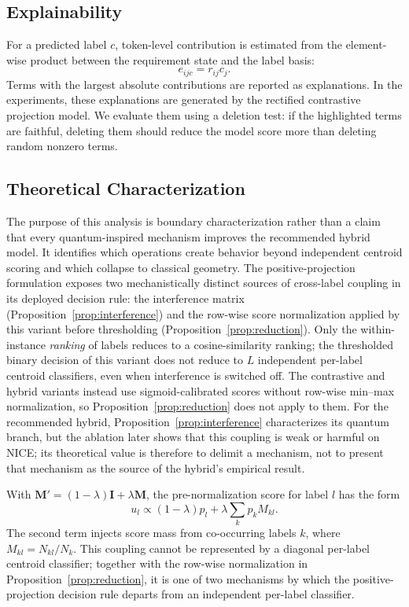 \documentclass[runningheads]{llncs}
\begin{document}
\subsection{Explainability}
For a predicted label $c$, token-level contribution is estimated from the
element-wise product between the requirement state and the label basis:
\begin{equation}
    e_{ijc} = r_{ij}c_j.
\end{equation}
Terms with the largest absolute contributions are reported as explanations. In
the experiments, these explanations are generated by the rectified contrastive
projection model. We evaluate them using a deletion test: if the highlighted
terms are faithful, deleting them should reduce the model score more than
deleting random nonzero terms.

\subsection{Theoretical Characterization}
The purpose of this analysis is boundary characterization rather than a claim
that every quantum-inspired mechanism improves the recommended hybrid model.
It identifies which operations create behavior beyond independent centroid
scoring and which collapse to classical geometry. The positive-projection
formulation exposes two mechanistically distinct
sources of cross-label coupling in its deployed decision rule: the interference
matrix (Proposition~\ref{prop:interference}) and the row-wise score
normalization applied by this variant before thresholding
(Proposition~\ref{prop:reduction}). Only the within-instance \emph{ranking}
of labels reduces to a cosine-similarity ranking; the thresholded binary
decision of this variant does not reduce to $L$ independent per-label centroid
classifiers, even when interference is switched off. The contrastive and hybrid
variants instead use sigmoid-calibrated scores without row-wise min--max
normalization, so Proposition~\ref{prop:reduction} does not apply to them. For
the recommended hybrid, Proposition~\ref{prop:interference} characterizes its
quantum branch, but the ablation later shows that this coupling is weak or
harmful on NICE; its theoretical value is therefore to delimit a mechanism,
not to present that mechanism as the source of the hybrid's empirical result.

\begin{proposition}
\label{prop:interference}
With $\mathbf{M}'=(1-\lambda)\mathbf{I}+\lambda\mathbf{M}$, the pre-normalization
score for label $l$ has the form
\begin{equation}
    u_l \propto (1-\lambda)p_l + \lambda\sum_k p_k M_{kl}.
\end{equation}
The second term injects score mass from co-occurring labels $k$, where
$M_{kl}=N_{kl}/N_k$. This coupling cannot be represented by a diagonal
per-label centroid classifier; together with the row-wise normalization in
Proposition~\ref{prop:reduction}, it is one of two mechanisms by which the
positive-projection decision rule departs from an independent per-label
classifier.
\end{proposition}
\end{document}
